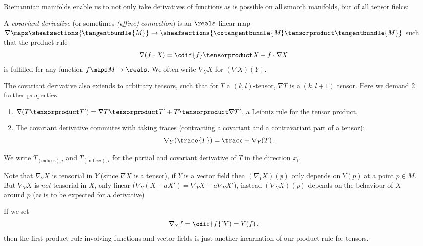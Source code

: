 \documentclass[titlepage,numbers=noenddot,oneside,%
cleardoublepage=empty,paper=a4,fontsize=11pt,%
english,%
]{scrartcl}
\newcommand*{\mathcomma}{\,,}
\newcommand*{\mathfullstop}{\,.}
\begin{document}
Riemannian manifolds enable us to not only take derivatives of functions as is possible on all smooth manifolds, but of all tensor fields:
\begin{definition}
    A \emph{covariant derivative} (or sometimes \emph{(affine) connection}) is an \( \reals \)-linear map \( \nabla\maps \sheafsections{\tangentbundle{M}}\to \sheafsections{\cotangentbundle{M}\tensorproduct \tangentbundle{M}} \) such that the product rule
    \begin{equation*}
        \nabla(f\cdot X)=\odif{f}\tensorproduct X+f\cdot \nabla X
    \end{equation*}
    is fulfilled for any function \( f \maps M\to \reals\). We often write \( \nabla_Y X \) for \( (\nabla X)(Y) \).

    The covariant derivative also extends to arbitrary tensors, such that for \( T \) a \( (k,l) \)-tensor, \( \nabla T \) is a \( (k,l+1) \) tensor. Here we demand 2 further properties:
    \begin{enumerate}
        \item \( \nabla(T\tensorproduct T')=\nabla T\tensorproduct T'+T\tensorproduct \nabla T' \), \ie a Leibniz rule for the tensor product.
        \item The covariant derivative commutes with taking traces (contracting a covariant and a contravariant part of a tensor):
        \begin{equation*}
            \nabla_Y (\trace{T})=\trace+{\nabla_Y(T)}\mathfullstop
        \end{equation*}
    \end{enumerate}
\end{definition}
\begin{notation}  \label{notation:derivative_indices}  
    We write \( T_{(\text{indices}),i} \) and \( T_{(\text{indices});i} \) for the partial and covariant derivative of \( T \) in the direction \( x_i \).
\end{notation}
\begin{remark}
    Note that \( \nabla_Y X \) is tensorial in \( Y \) (since \( \nabla X \) is a tensor), \ie if \( Y  \) is a vector field then \( (\nabla_Y X)(p) \) only depends on \( Y(p) \) at a point \( p\in M \). But \( \nabla_Y X \) is \emph{not} tensorial in \( X \), only linear (\ie \( \nabla_Y (X+aX')=\nabla_Y X+ a\nabla_Y X' \)), instead \( (\nabla_Y X)(p) \) depends on the behaviour of \( X \) around \( p \) (as is to be expected for a derivative)
\end{remark}
\begin{remark}
    If we set
    \begin{equation*}
        \nabla_Y f =\odif{f}(Y)=Y(f)\mathcomma
    \end{equation*}
    then the first product rule involving functions and vector fields is just another incarnation of our product rule for tensors.
\end{remark}
\end{document}
